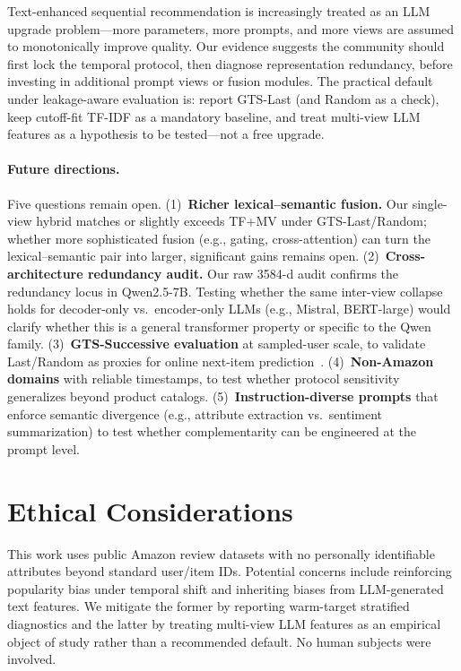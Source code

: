 \documentclass[sigconf,natbib=true,anonymous]{acmart}
\newcommand{\tfidf}{\textsc{TF-IDF}\xspace}
\newcommand{\tfmv}{\textsc{TF+MV}\xspace}
\begin{document}
Text-enhanced sequential recommendation is increasingly treated as an LLM upgrade problem---more parameters, more prompts, and more views are assumed to monotonically improve quality.
Our evidence suggests the community should first lock the temporal protocol, then diagnose representation redundancy, before investing in additional prompt views or fusion modules.
The practical default under leakage-aware evaluation is: report GTS-Last (and Random as a check), keep cutoff-fit \tfidf as a mandatory baseline, and treat multi-view LLM features as a hypothesis to be tested---not a free upgrade.

\paragraph{Future directions.}
Five questions remain open.
(1)~\textbf{Richer lexical--semantic fusion.}  Our single-view hybrid matches or slightly exceeds \tfmv under GTS-Last/Random; whether more sophisticated fusion (e.g., gating, cross-attention) can turn the lexical--semantic pair into larger, significant gains remains open.
(2)~\textbf{Cross-architecture redundancy audit.}  Our raw 3584-d audit confirms the redundancy locus in Qwen2.5-7B.  Testing whether the same inter-view collapse holds for decoder-only vs.\ encoder-only LLMs (e.g., Mistral, BERT-large) would clarify whether this is a general transformer property or specific to the Qwen family.
(3)~\textbf{GTS-Successive evaluation} at sampled-user scale, to validate Last/Random as proxies for online next-item prediction~\cite{gusak2025time}.
(4)~\textbf{Non-Amazon domains} with reliable timestamps, to test whether protocol sensitivity generalizes beyond product catalogs.
(5)~\textbf{Instruction-diverse prompts} that enforce semantic divergence (e.g., attribute extraction vs.\ sentiment summarization) to test whether complementarity can be engineered at the prompt level.

\section*{Ethical Considerations}
This work uses public Amazon review datasets with no personally identifiable attributes beyond standard user/item IDs.
Potential concerns include reinforcing popularity bias under temporal shift and inheriting biases from LLM-generated text features.
We mitigate the former by reporting warm-target stratified diagnostics and the latter by treating multi-view LLM features as an empirical object of study rather than a recommended default.
No human subjects were involved.
\end{document}
